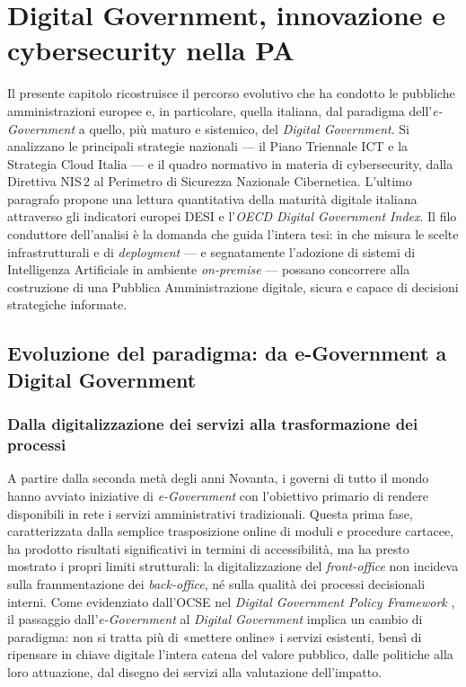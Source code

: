 \chapter{Digital Government, innovazione e cybersecurity nella PA}
\label{chap:digital-government}

Il presente capitolo ricostruisce il percorso evolutivo che ha condotto le pubbliche amministrazioni europee e, in particolare, quella italiana, dal paradigma dell'\textit{e-Government} a quello, più maturo e sistemico, del \textit{Digital Government}. Si analizzano le principali strategie nazionali --- il Piano Triennale ICT e la Strategia Cloud Italia --- e il quadro normativo in materia di cybersecurity, dalla Direttiva NIS\,2 al Perimetro di Sicurezza Nazionale Cibernetica. L'ultimo paragrafo propone una lettura quantitativa della maturità digitale italiana attraverso gli indicatori europei DESI e l'\textit{OECD Digital Government Index}. Il filo conduttore dell'analisi è la domanda che guida l'intera tesi: in che misura le scelte infrastrutturali e di \textit{deployment} --- e segnatamente l'adozione di sistemi di Intelligenza Artificiale in ambiente \textit{on-premise} --- possano concorrere alla costruzione di una Pubblica Amministrazione digitale, sicura e capace di decisioni strategiche informate.


\section{Evoluzione del paradigma: da e-Government a Digital Government}
\label{sec:evoluzione-paradigma}

\subsection{Dalla digitalizzazione dei servizi alla trasformazione dei processi}

A partire dalla seconda metà degli anni Novanta, i governi di tutto il mondo hanno avviato iniziative di \textit{e-Government} con l'obiettivo primario di rendere disponibili in rete i servizi amministrativi tradizionali. Questa prima fase, caratterizzata dalla semplice trasposizione online di moduli e procedure cartacee, ha prodotto risultati significativi in termini di accessibilità, ma ha presto mostrato i propri limiti strutturali: la digitalizzazione del \textit{front-office} non incideva sulla frammentazione dei \textit{back-office}, né sulla qualità dei processi decisionali interni. Come evidenziato dall'OCSE nel \textit{Digital Government Policy Framework} \textcite{OECDDigitalGovFramework}, il passaggio dall'\textit{e-Government} al \textit{Digital Government} implica un cambio di paradigma: non si tratta più di «mettere online» i servizi esistenti, bensì di ripensare in chiave digitale l'intera catena del valore pubblico, dalle politiche alla loro attuazione, dal disegno dei servizi alla valutazione dell'impatto.

